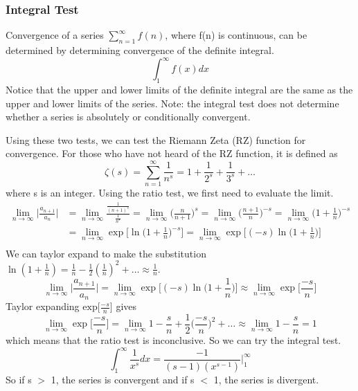 \documentclass{article}
\newcommand{\be}{\begin{equation}}
\newcommand{\ee}{\end{equation}}
\begin{document}
\subsubsection*{Integral Test}
Convergence of a series $\sum\limits_{n=1}^{\infty} f(n)$, where f(n) is continuous, can be determined by determining convergence of the definite integral.
\be
\int_{1}^{\infty}f(x)dx
\ee
Notice that the upper and lower limits of the definite integral are the same as the upper and lower limits of the series.
Note: the integral test does not determine whether a series is absolutely or conditionally convergent.

Using these two tests, we can test the Riemann Zeta (RZ) function for convergence.
For those who have not heard of the RZ function, it is defined as
\be
\zeta(s) = \sum_{n=1}^{\infty} \frac{1}{n^s} = 1 + \frac{1}{2^s} + \frac{1}{3^s}+ \hdots
\ee
where s is an integer.
Using the ratio test, we first need to evaluate the limit.
\begin{align}
\lim_{n \to \infty} \Big| \frac{a_{n+1}}{a_n} \Big| &= \lim_{n \to \infty} \frac{\frac{1}{(n+1)^s}}{\frac{1}{n^s}} = \lim_{n \to \infty} \Big( \frac{n}{n+1} \Big) ^s
= \lim_{n \to \infty} \Big( \frac{n+1}{n} \Big) ^{-s} = \lim_{n \to \infty} \Big( 1 + \frac{1}{n} \Big) ^{-s} \\
&= \lim_{n \to \infty} \exp \Big[ \ln \Big( 1 + \frac{1}{n} \Big) ^{-s} \Big] = \lim_{n \to \infty} \exp \Big[ (-s) \ln \Big( 1 + \frac{1}{n} \Big) \Big] \\
\end{align}
We can taylor expand to make the substitution $\ln(1 + \frac{1}{n}) = \frac{1}{n} - \frac{1}{2}(\frac{1}{n})^2 + \hdots \approx \frac{1}{n}$.
\be
\lim_{n \to \infty} \Big| \frac{a_{n+1}}{a_n} \Big| = \lim_{n \to \infty} \exp \Big[ (-s) \ln \Big( 1 + \frac{1}{n} \Big) \Big] \approx \lim_{n \to \infty} \exp \Big[ \frac{-s}{n} \Big]
\ee
Taylor expanding $\text{exp} \Big[ \frac{-s}{n} \Big]$ gives
\be
\lim_{n \to \infty} \exp \Big[ \frac{-s}{n} \Big] = \lim_{n \to \infty} 1 - \frac{s}{n} + \frac{1}{2} \Big( \frac{-s}{n} \Big)^2 + \hdots \approx \lim_{n \to \infty} 1 - \frac{s}{n} = 1
\ee
which means that the ratio test is inconclusive. So we can try the integral test.
\be
\int_{1}^{\infty} \frac{1}{x^s} dx = \frac{-1}{(s-1)(x^{s-1})} \Big\vert_{1}^{\infty}
\ee
So if s $>$ 1, the series is convergent and if s $<$ 1, the series is divergent.
\end{document}
